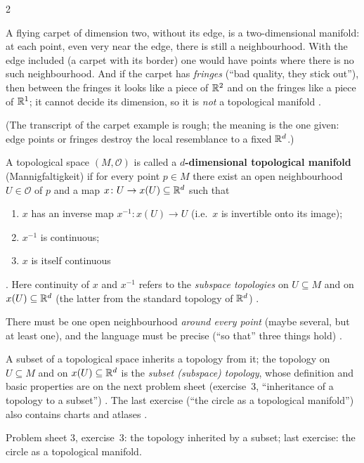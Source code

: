 \begin{paracol}{2}
\begin{example}\label{ex:tm-carpet}
A flying carpet of dimension two, without its edge, is a two-dimensional manifold: at each point, even very near the edge, there
is still a neighbourhood. With the edge included (a carpet with its border) one would have points where there is no such
neighbourhood. And if the carpet has \emph{fringes} (``bad quality, they stick out''), then between the fringes it looks
like a piece of $\mathbb{R}^2$ and on the fringes like a piece of $\mathbb{R}^1$; it cannot decide its dimension, so it is
\emph{not} a topological manifold .
\end{example}
(The transcript of the carpet example is rough; the meaning is the one given: edge points or fringes destroy the local
resemblance to a fixed $\mathbb{R}^d$.)

\begin{definition}\label{def:tm-manifold}
A topological space $(M,\mathcal O)$ is called a \textbf{$d$-dimensional topological manifold}
(Mannigfaltigkeit) if for every point $p\in M$ there exist an open neighbourhood $U\in\mathcal O$ of $p$ and a map
$x\colon U\to x(U)\subseteq\mathbb{R}^d$ such that
\begin{enumerate}
  \item $x$ has an inverse map $x^{-1}\colon x(U)\to U$ (i.e.\ $x$ is invertible onto its image);
  \item $x^{-1}$ is continuous;
  \item $x$ is itself continuous
\end{enumerate}
.
Here continuity of $x$ and $x^{-1}$ refers to the \emph{subspace topologies} on $U\subseteq M$ and on
$x(U)\subseteq\mathbb{R}^d$ (the latter from the standard topology of $\mathbb{R}^d$) .
\end{definition}
There must be one open neighbourhood \emph{around every point} (maybe several, but at least one), and the language must be
precise (``so that'' three things hold) .
\begin{coursenote}
A subset of a topological space inherits a topology from it; the topology on $U\subseteq M$ and on $x(U)\subseteq\mathbb{R}^d$
is the \emph{subset (subspace) topology}, whose definition and basic properties are on the next problem sheet
(exercise~3, ``inheritance of a topology to a subset'') . The last
exercise (``the circle as a topological manifold'') also contains charts and atlases .
\end{coursenote}
\begin{exercise}\label{ex:tm-subspace}
Problem sheet 3, exercise~3: the topology inherited by a subset; last exercise: the circle as a topological manifold.
\end{exercise}


\end{paracol}
